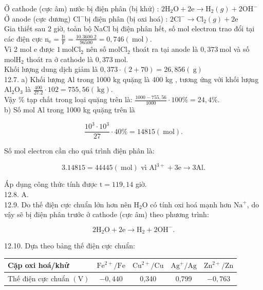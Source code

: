 \documentclass[10pt]{article}
\begin{document}
Ở cathode (cực âm) nước bị điện phân (bị khử) : $2 \mathrm{H}_{2} \mathrm{O}+2 \mathrm{e} \rightarrow \mathrm{H}_{2}(g)+2 \mathrm{OH}^{-}$\\
Ở anode (cực dương) $\mathrm{Cl}^{-}$bị điện phân (bị oxi hoá) : $2 \mathrm{Cl}^{-} \rightarrow \mathrm{Cl}_{2}(g)+2 \mathrm{e}$\\
Gia thiết sau 2 giờ, toàn bộ NaCl bị điện phân hết, số mol electron trao đổi tại các điện cực $\mathrm{n}_{\mathrm{e}}=\frac{\mathrm{It}}{\mathrm{F}}=\frac{10.3600 .2}{96500}=0,746(\mathrm{~mol})$.\\
Vì 2 mol e được $1 \mathrm{~mol} \mathrm{Cl}_{2}$ nên số $\mathrm{mol} \mathrm{Cl}_{2}$ thoát ra tại anode là $0,373 \mathrm{~mol}$ và số $\mathrm{mol} \mathrm{H}_{2}$ thoát ra ở cathode là $0,373 \mathrm{~mol}$.\\
Khối lượng dung dịch giảm là $0,373 \cdot(2+70)=26,856(\mathrm{~g})$\\
12.7. a) Khối lượng Al trong 1000 kg quặng là 400 kg , tương ứng với khối lượng $\mathrm{Al}_{2} \mathrm{O}_{3}$ là $\frac{400}{27.2} \cdot 102=755,56(\mathrm{~kg})$.\\
Vậy \% tạp chất trong loại quặng trên là: $\frac{1000-755,56}{1000} \cdot 100 \%=24,4 \%$.\\
b) Số mol Al trong 1000 kg quặng trên là

$$
\frac{10^{3} \cdot 10^{3}}{27} \cdot 40 \%=14815(\mathrm{~mol}) .
$$

Số mol electron cần cho quá trình điện phân là:

$$
3.14815=44445(\mathrm{~mol}) \text { vì } \mathrm{Al}^{3+}+3 \mathrm{e} \rightarrow 3 \mathrm{Al} .
$$

Áp dụng công thức tính được $\mathrm{t}=119,14$ giờ.\\
12.8. A.\\
12.9. Do thế điện cực chuẩn lớn hơn nên $\mathrm{H}_{2} \mathrm{O}$ có tính oxi hoá mạnh hơn $\mathrm{Na}^{+}$, do vậy sẽ bị điện phân trước ở cathode (cực âm) theo phương trình:

$$
2 \mathrm{H}_{2} \mathrm{O}+2 \mathrm{e} \rightarrow \mathrm{H}_{2}+2 \mathrm{OH}^{-} .
$$

12.10. Dựa theo bảng thế điện cực chuẩn:

\begin{center}
\begin{tabular}{|l|c|c|c|c|}
\hline
Cặp oxi hoá/khử & $\mathrm{Fe}^{2+} / \mathrm{Fe}$ & $\mathrm{Cu}^{2+} / \mathrm{Cu}$ & $\mathrm{Ag}^{+} / \mathrm{Ag}$ & $\mathrm{Zn}^{2+} / \mathrm{Zn}$ \\
\hline
Thế điện cực chuẩn $(\mathrm{V})$ & $-0,440$ & 0,340 & 0,799 & $-0,763$ \\
\hline
\end{tabular}
\end{center}
\end{document}

